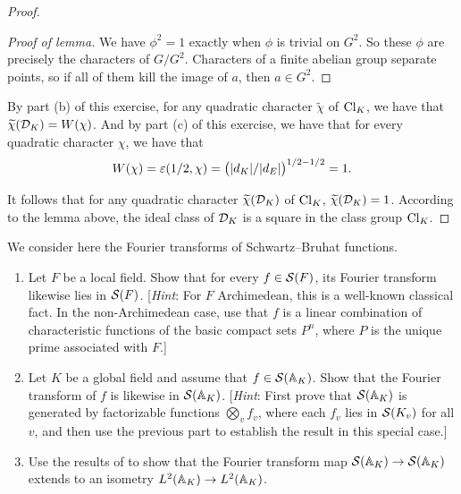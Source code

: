 \begin{proof}
   \begin{proof}[Proof of lemma]
    We have $\phi^2=1$ exactly when $\phi$ is trivial on $G^2$. So these $\phi$ are
    precisely the characters of $G/G^2$. Characters of a finite abelian group separate points,
    so if all of them kill the image of $a$, then $a\in G^2$.
   \end{proof}

   By part (b) of this exercise, for any quadratic character $\widetilde{\chi}$ of $\operatorname{Cl}_K$, we have
   that $\widetilde{\chi}(\mathcal{D}_K) = W(\chi)$. And by part (c) of this exercise,
   we have that for every quadratic character $\chi$, we have that
   \[ W(\chi) = \varepsilon (1/2, \chi) = \bigl(\lvert d_K\rvert /\lvert d_E\rvert\bigr)^{1/2-1/2} = 1. \]

   It follows that for any quadratic character $\widetilde{\chi}(\mathcal{D}_K)$ of $\operatorname{Cl}_K$,
   $\widetilde{\chi}(\mathcal{D}_K) = 1$. According to the lemma above, the ideal class of $\mathcal{D}_K$ is a
  square in the class group $\operatorname{Cl}_K$.
\end{proof}

\begin{exercise}[12]
  \label{ex:ch7-12}
  We consider here the Fourier transforms of Schwartz--Bruhat functions.
  \begin{enumerate}[label=(\alph*)]
    \item Let $F$ be a local field. Show that for every $f \in \mathcal{S}(F)$, its
      Fourier transform likewise lies in $\mathcal{S}(F)$. [\emph{Hint}: For $F$
      Archimedean, this is a well-known classical fact. In the
      non-Archimedean case, use that $f$ is a linear combination of
      characteristic functions of the basic compact sets $P^n$, where $P$ is
      the unique prime associated with $F$.]
    \item Let $K$ be a global field and assume that $f \in \mathcal{S}(\mathbb{A}_K)$.
      Show that the Fourier transform of $f$ is likewise in $\mathcal{S}(\mathbb{A}_K)$.
      [\emph{Hint}: First prove that $\mathcal{S}(\mathbb{A}_K)$ is generated by
      factorizable functions $\bigotimes_v f_v$, where each $f_v$ lies in
      $\mathcal{S}(K_v)$ for all $v$, and then use the previous part to establish
      the result in this special case.]
    \item Use the results of  to show that the Fourier
      transform map $\mathcal{S}(\mathbb{A}_K) \to \mathcal{S}(\mathbb{A}_K)$ extends to an isometry
      $L^2(\mathbb{A}_K) \to L^2(\mathbb{A}_K)$.
  \end{enumerate}
\end{exercise}

